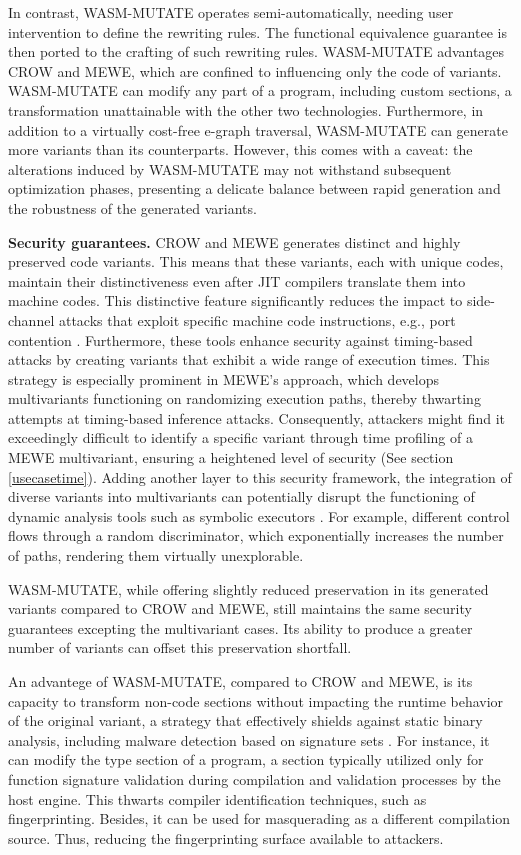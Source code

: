 In contrast, WASM-MUTATE operates semi-automatically, needing user intervention to define the rewriting rules.
The functional equivalence guarantee is then ported to the crafting of such rewriting rules. 
WASM-MUTATE advantages CROW and MEWE, which are confined to influencing only the code of \wasm variants. WASM-MUTATE can modify any part of a \wasm program, including custom sections, a transformation unattainable with the other two technologies. 
Furthermore, in addition to a virtually cost-free e-graph traversal, WASM-MUTATE can generate more variants than its counterparts. 
However, this comes with a caveat: the alterations induced by WASM-MUTATE may not withstand subsequent optimization phases, presenting a delicate balance between rapid generation and the robustness of the generated variants. 


\textbf{Security guarantees.}
CROW and MEWE generates distinct and highly preserved code variants. 
This means that these variants, each with unique \Wasm codes, maintain their distinctiveness even after JIT compilers translate them into machine codes. 
This distinctive feature significantly reduces the impact to side-channel attacks that exploit specific machine code instructions, e.g., port contention \cite{port contention}.
Furthermore, these tools enhance security against timing-based attacks by creating variants that exhibit a wide range of execution times. 
This strategy is especially prominent in MEWE’s approach, which develops multivariants functioning on randomizing execution paths, thereby thwarting attempts at timing-based inference attacks. 
Consequently, attackers might find it exceedingly difficult to identify a specific variant through time profiling of a MEWE multivariant, ensuring a heightened level of security (See section \autoref{usecasetime}).
Adding another layer to this security framework, the integration of diverse variants into multivariants can potentially disrupt the functioning of dynamic analysis tools such as symbolic executors \cite{opaque predicate}. 
For example, different control flows through a random discriminator, which exponentially increases the number of paths, rendering them virtually unexplorable.

WASM-MUTATE, while offering slightly reduced preservation in its generated variants compared to CROW and MEWE, still maintains the same security guarantees excepting the multivariant cases.
Its ability to produce a greater number of variants can offset this preservation shortfall.

An advantege of WASM-MUTATE, compared to CROW and MEWE, is its capacity to transform non-code sections without impacting the runtime behavior of the original variant, a strategy that effectively shields against static binary analysis, including malware detection based on signature sets \cite{CABRERAARTEAGA2023103296}.
For instance, it can modify the type section of a \Wasm program, a section typically utilized only for function signature validation during compilation and validation processes by the host engine. 
This thwarts compiler identification techniques, such as fingerprinting.
Besides, it can be used for masquerading as a different compilation source.
Thus, reducing the fingerprinting surface available to attackers.

